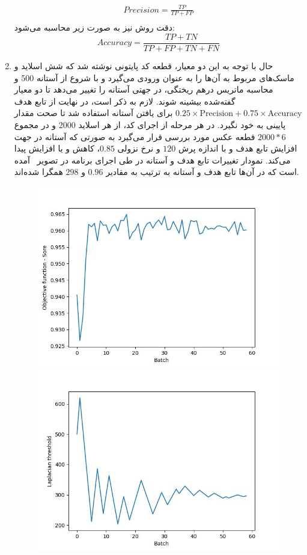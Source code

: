 \begin{enumerate}
\begin{gather*}
        Precision = \frac{TP}{TP + FP}\\
    \end{gather*}
    دقت روش نیز به صورت زیر محاسبه می‌شود:
    \[Accuracy = \frac{TP + TN}{TP + FP + TN + FN}\]
    \item حال با توجه به این دو معیار، قطعه کد پایتونی نوشته شد که شش اسلاید و ماسک‌های مربوط به آن‌ها را به عنوان ورودی می‌گیرد و با شروع از آستانه 500 و محاسبه ماتریس درهم ریختگی، در جهتی آستانه را تغییر می‌دهد تا دو معیار گفته‌شده بیشینه شوند.
    لازم به ذکر است، در نهایت از تابع هدف
     $0.25\times\text{Precision}+0.75\times\text{Accuracy}$
      برای یافتن آستانه استفاده شد تا صحت مقدار پایینی به خود نگیرد.
    در هر مرحله از اجرای کد، از هر اسلاید 2000 و در مجموع $2000 * 6$ قطعه عکس مورد بررسی قرار می‌گیرد به صورتی که آستانه در جهت افزایش تابع هدف و با اندازه پرش $120$ و نرخ نزولی $0.85$، کاهش و یا افزایش پیدا می‌کند.
    نمودار تغییرات تابع هدف و آستانه در طی اجرای برنامه در تصویر~ آمده است که در آن‌ها تابع هدف و آستانه به ترتیب به مقادیر $0.96$ و $298$ همگرا شده‌اند.
    \begin{figure}
        \begin{center}
            \includegraphics[width=0.48\linewidth]{figs/introduction/subs/challenges/laplacian_threshold_score_history_chart.jpeg}
            \includegraphics[width=0.48\linewidth]{figs/introduction/subs/challenges/laplacian_threshold_history_chart.jpeg}
        \end{center}

\end{figure}
\end{enumerate}

